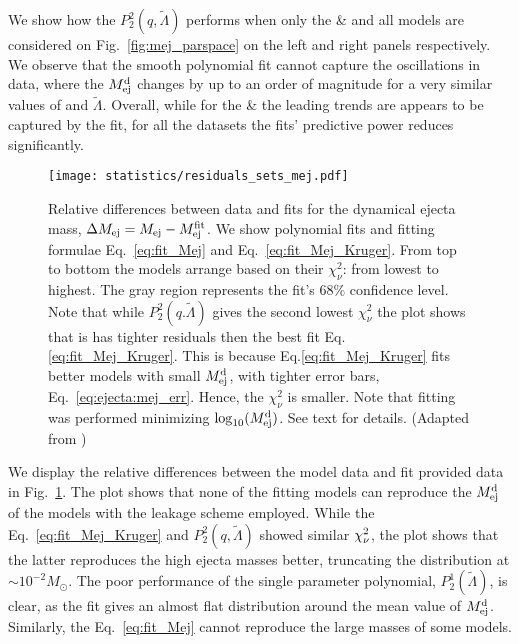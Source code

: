 We show how the $P_2^2(q,\tilde{\Lambda})$ performs when only the 
\DSrefset{} \& \DSheatcool{} and all models are considered on Fig.~\ref{fig:mej_parspace} 
on the left and right panels respectively. 
We observe that the smooth polynomial fit cannot capture the oscillations in data, where 
the $M^{\text{d}}_{\text{ej}}$ changes by up to an order of magnitude for a very similar values of \mr{} and 
$\tilde{\Lambda}$. Overall, while for the \DSrefset{} \& \DSheatcool{} the leading trends 
are appears to be captured by the fit, for all the datasets the fits' predictive power 
reduces significantly.
%
\begin{figure}[t]
    \centering 
    \texttt{[image: statistics/residuals\_sets\_mej.pdf]}
    \caption{
        Relative differences between data and fits for the dynamical ejecta
        mass, $\Delta M_{\rm ej} = M_{\rm ej} - M^{\rm fit}_{\rm ej}$.
        We show polynomial fits and fitting formulae
        Eq.~\eqref{eq:fit_Mej} and Eq.~\eqref{eq:fit_Mej_Kruger}.
        From top to bottom the models arrange based on their $\chi_{\nu}^2$: from lowest to highest.
        The gray region represents the fit's $68\%$ confidence level.
        Note that while $P_2^2(q.\tilde{\Lambda})$ gives the second lowest $\chi_{\nu}^2$
        the plot shows that is has tighter residuals then the best fit Eq.\eqref{eq:fit_Mej_Kruger}.
        This is because Eq.\eqref{eq:fit_Mej_Kruger} fits better models with small $M^{\text{d}}_{\text{ej}}$,
        with tighter error bars, Eq.~\eqref{eq:ejecta:mej_err}. Hence,
        the $\chi_{\nu}^2$ is smaller.
        Note that fitting was performed minimizing $\log_{10}(M^{\text{d}}_{\text{ej}})$. See text for details.
        (Adapted from \citet{Nedora:2020qtd})
    }
    \label{fig:ejecta:dyn:m}
\end{figure}


We display the relative differences between the model data and fit provided data in 
Fig.~\ref{fig:ejecta:dyn:m}. The plot shows that none of the fitting models can 
reproduce the $M^{\text{d}}_{\text{ej}}$ of the \DScool{} models with the leakage scheme employed.
%
While the Eq.~\eqref{eq:fit_Mej_Kruger} and $P_2^2(q,\tilde{\Lambda})$ showed similar 
$\chi_{\nu}^2$, the plot shows that the latter reproduces the high ejecta masses better, 
truncating the distribution at $\sim10^{-2}M_{\odot}$. 
The poor performance of the single parameter polynomial, $P_2^1(\tilde{\Lambda})$,
is clear, as the fit gives an almost flat distribution around the mean value of $M^{\text{d}}_{\text{ej}}$.
Similarly, the Eq.~\eqref{eq:fit_Mej} cannot reproduce the large masses of some 
models.
%

